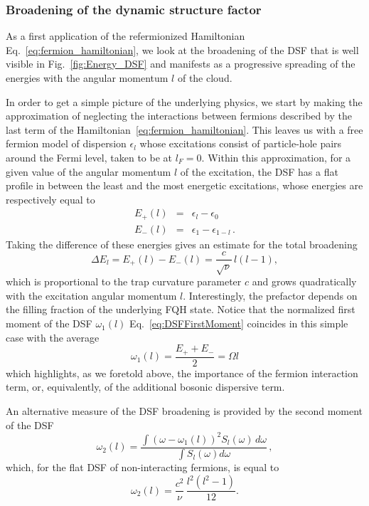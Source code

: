 \documentclass[twocolumn,pra,superscriptaddress,noshowpacs]{revtex4}
\begin{document}
\subsubsection{Broadening of the dynamic structure factor}\label{subsec:dsf_broadening}

As a first application of the refermionized Hamiltonian Eq.~\eqref{eq:fermion_hamiltonian}, we look at the broadening of the DSF that is well visible in Fig.~\ref{fig:Energy_DSF} and manifests as a progressive spreading of the energies with the angular momentum $l$ of the cloud.

In order to get a simple picture of the underlying physics, we start by making the approximation of neglecting the interactions between fermions described by the last term of the Hamiltonian~\eqref{eq:fermion_hamiltonian}. This leaves us with a free fermion model of dispersion $\epsilon_l$ whose excitations consist of particle-hole pairs around the Fermi level, taken to be at $l_F=0$. Within this approximation, for a given value of the angular momentum $l$ of the excitation, the DSF has a flat profile in between the least and the most energetic excitations, whose energies are respectively equal to
\begin{eqnarray}
\label{eq:energies}
E_+(l)&=&\epsilon_{l}-\epsilon_0 \\
E_-(l)&=&\epsilon_1-\epsilon_{1-l}\,.
\end{eqnarray}
Taking the difference of these energies gives an estimate for the total broadening
\begin{equation}
    \label{eq:broadening1}
    \Delta E_l = E_+(l)-E_-(l)=\frac{c}{\sqrt{\nu}}\,l(l-1),
\end{equation}
which is proportional to the trap curvature parameter $c$ and grows quadratically with the excitation angular momentum $l$. Interestingly, the prefactor depends on the filling fraction of the underlying FQH state.
Notice that the normalized first moment of the DSF $\omega_1(l)$ Eq.~\eqref{eq:DSFFirstMoment} coincides in this simple case with the average
\begin{equation}
    \label{eq:DSFcenter}
	\omega_1(l)=\frac{E_++E_-}{2}=\Omega l
\end{equation}
which highlights, as we foretold above, the importance of the fermion interaction term, or, equivalently, of the additional bosonic dispersive term.

An alternative measure of the DSF broadening is provided by the second moment of the DSF 
\begin{equation}
\label{eq:omega2}
    \omega_2(l) = \frac{\int (\omega - \omega_1(l))^2 S_l(\omega)\, d\omega}{\int S_l(\omega) d\omega}\,,
\end{equation}
which, for the flat DSF of non-interacting fermions, is equal to
\begin{equation}
    \label{eq:broadening2}
    \omega_2(l) = \frac{c^2}{\nu}\,\frac{l^2(l^2-1)}{12}.
\end{equation}
\end{document}
